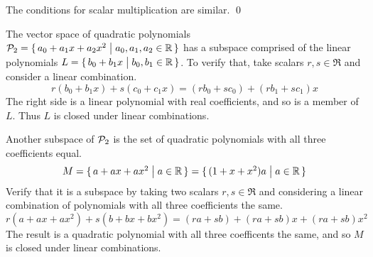 \documentclass[10pt,t,serif,professionalfont]{beamer}
\begin{document}
\begin{frame}
\lm[th:SubspIffClosed]

\pause\medskip
{}
\end{frame}\begin{frame}
\pf[th:SubspIffClosed]

\pause
The conditions for scalar multiplication are similar.
\qed
\end{frame}




\begin{frame}
\ex
The vector space of quadratic polynomials
$\mathcal{P}_2=\mbox{$\{\,a_0+a_1x+a_2x^2\bigm| a_0,a_1,a_2\in\mathbb{R}\,\}$}$ has a subspace
comprised of the linear polynomials
$L=\mbox{$\{\,b_0+b_1x\bigm| b_0,b_1\in\mathbb{R}\,\}$}$.
To verify that, take scalars $r,s\in\Re$ and consider a linear combination.
\begin{equation*}
  r(b_0+b_1x)+s(c_0+c_1x)=(rb_0+sc_0)+(rb_1+sc_1)x
\end{equation*}
The right side is a linear polynomial with real coefficients, and so is a 
member of $L$.
Thus $L$ is closed under linear combinations.

\pause
\ex
Another subspace of $\mathcal{P}_2$ is the set of quadratic polynomials
with all three coefficients equal.
\begin{equation*}
  M=\mbox{$\{\,a+ax+ax^2\bigm| a\in\mathbb{R}\,\}$}
   =\mbox{$\{\,(1+x+x^2)a\bigm| a\in\mathbb{R}\,\}$}
\end{equation*}
Verify that it is a subspace by taking two scalars $r,s\in\Re$
and considering a linear combination of polynomials with all 
three coefficients the same.
\begin{equation*}
  r(a+ax+ax^2)+s(b+bx+bx^2)
  =(ra+sb)+(ra+sb)x+(ra+sb)x^2
\end{equation*}
The result is a quadratic polynomial with all three coefficents the same, 
and so $M$ is closed under linear combinations.
\end{frame}
\end{document}
